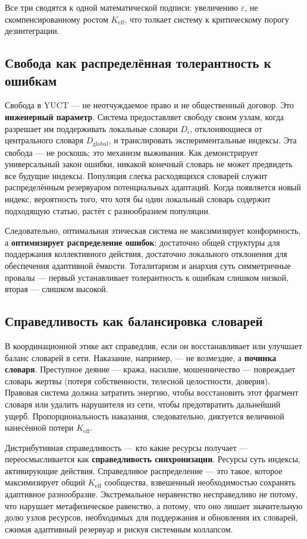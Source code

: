 \documentclass[12pt,a4paper]{article}
\begin{document}
	Все три сводятся к одной математической подписи: увеличению \(\varepsilon\), не скомпенсированному ростом \(K_{\mathrm{eff}}\), что толкает систему к критическому порогу дезинтеграции.
	
	\subsection{Свобода как распределённая толерантность к ошибкам}
	
	Свобода в YUCT — не неотчуждаемое право и не общественный договор. Это \textbf{инженерный параметр}. Система предоставляет свободу своим узлам, когда разрешает им поддерживать локальные словари \(D_i\), отклоняющиеся от центрального словаря \(D_{\text{global}}\), и транслировать экспериментальные индексы. Эта свобода — не роскошь; это механизм выживания. Как демонстрирует универсальный закон ошибки, никакой конечный словарь не может предвидеть все будущие индексы. Популяция слегка расходящихся словарей служит распределённым резервуаром потенциальных адаптаций. Когда появляется новый индекс, вероятность того, что хотя бы один локальный словарь содержит подходящую статью, растёт с разнообразием популяции.
	
	Следовательно, оптимальная этическая система не максимизирует конформность, а \textbf{оптимизирует распределение ошибок}: достаточно общей структуры для поддержания коллективного действия, достаточно локального отклонения для обеспечения адаптивной ёмкости. Тоталитаризм и анархия суть симметричные провалы — первый устанавливает толерантность к ошибкам слишком низкой, вторая — слишком высокой.
	
	\subsection{Справедливость как балансировка словарей}
	
	В координационной этике акт справедлив, если он восстанавливает или улучшает баланс словарей в сети. Наказание, например, — не возмездие, а \textbf{починка словаря}. Преступное деяние — кража, насилие, мошенничество — повреждает словарь жертвы (потеря собственности, телесной целостности, доверия). Правовая система должна затратить энергию, чтобы восстановить этот фрагмент словаря или удалить нарушителя из сети, чтобы предотвратить дальнейший ущерб. Пропорциональность наказания, следовательно, диктуется величиной нанесённой потери \(K_{\mathrm{eff}}\).
	
	Дистрибутивная справедливость — кто какие ресурсы получает — переосмысливается как \textbf{справедливость синхронизации}. Ресурсы суть индексы, активирующие действия. Справедливое распределение — это такое, которое максимизирует общий \(K_{\mathrm{eff}}\) сообщества, взвешенный необходимостью сохранять адаптивное разнообразие. Экстремальное неравенство несправедливо не потому, что нарушает метафизическое равенство, а потому, что оно лишает значительную долю узлов ресурсов, необходимых для поддержания и обновления их словарей, сжимая адаптивный резервуар и рискуя системным коллапсом.
	
\end{document}
